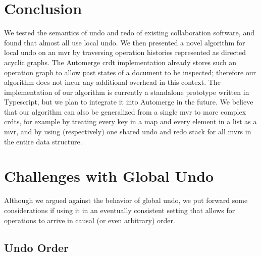 \documentclass[sigplan,natbib=false,review]{acmart}
\begin{document}
\section{Conclusion}\label{sec:conclusion}

We tested the semantics of undo and redo of existing collaboration software,
and found that almost all use local undo.
We then presented a novel algorithm for local undo on an \gls*{mvr}
by traversing operation histories represented as directed acyclic graphs.
The Automerge \gls{crdt} implementation already stores such an operation graph
to allow past states of a document to be inspected;
therefore our algorithm does not incur any additional overhead in this context.
The implementation of our algorithm is currently a standalone prototype
written in Typescript, but we plan to integrate it into Automerge in the future.
We believe that our algorithm can also be generalized from a single \gls{mvr}
to more complex \glspl{crdt}, for example by treating every key in a map and
every element in a list as a \gls{mvr}, and by using (respectively) one shared
undo and redo stack for all \glspl{mvr} in the entire data structure.

\printbibliography

\appendix

\section{Challenges with Global Undo}\label{adx:global-undo-challenges}

Although we argued against the behavior of global undo, we put forward
some considerations if using it in an eventually consistent setting that
allows for operations to arrive in causal (or even arbitrary) order.

\subsection{Undo Order}
\end{document}
